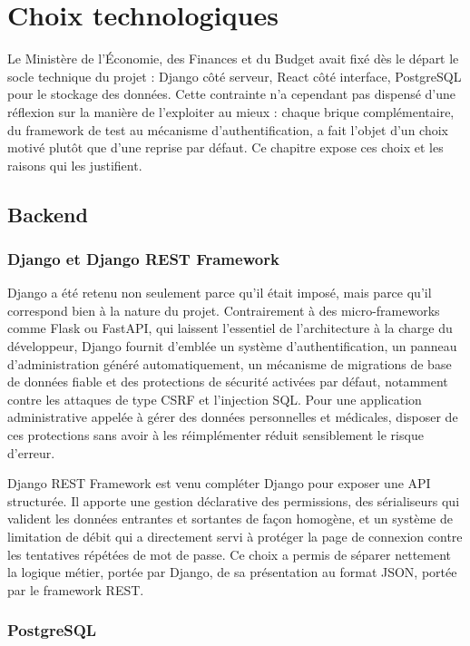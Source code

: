 \chapter{Choix technologiques}
\label{chap:choix-technologiques}

Le Ministère de l'Économie, des Finances et du Budget avait fixé dès le départ le socle technique du projet : Django côté serveur, React côté interface, PostgreSQL pour le stockage des données. Cette contrainte n'a cependant pas dispensé d'une réflexion sur la manière de l'exploiter au mieux : chaque brique complémentaire, du framework de test au mécanisme d'authentification, a fait l'objet d'un choix motivé plutôt que d'une reprise par défaut. Ce chapitre expose ces choix et les raisons qui les justifient.

\section{Backend}

\subsection{Django et Django REST Framework}

Django a été retenu non seulement parce qu'il était imposé, mais parce qu'il correspond bien à la nature du projet. Contrairement à des micro-frameworks comme Flask ou FastAPI, qui laissent l'essentiel de l'architecture à la charge du développeur, Django fournit d'emblée un système d'authentification, un panneau d'administration généré automatiquement, un mécanisme de migrations de base de données fiable et des protections de sécurité activées par défaut, notamment contre les attaques de type CSRF et l'injection SQL. Pour une application administrative appelée à gérer des données personnelles et médicales, disposer de ces protections sans avoir à les réimplémenter réduit sensiblement le risque d'erreur.

Django REST Framework est venu compléter Django pour exposer une API structurée. Il apporte une gestion déclarative des permissions, des sérialiseurs qui valident les données entrantes et sortantes de façon homogène, et un système de limitation de débit qui a directement servi à protéger la page de connexion contre les tentatives répétées de mot de passe. Ce choix a permis de séparer nettement la logique métier, portée par Django, de sa présentation au format JSON, portée par le framework REST.

\subsection{PostgreSQL}

